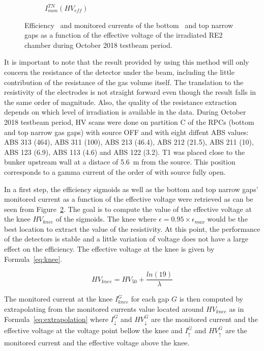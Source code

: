 \begin{figure}[H]
\begin{subfigure}{0.5\linewidth}
        	\caption{\label{fig:october-sig:C} $I_{mon}^{TN}(HV_{eff})$}
    	\end{subfigure}
		\caption{\label{fig:october-sig} Efficiency~ and monitored currents of the bottom~ and top narrow~ gaps as a function of the effective voltage of the irradiated RE2 chamber during October 2018 testbeam period.}
	\end{figure}
	
	It is important to note that the result provided by using this method will only concern the resistance of the detector under the beam, including the little contribution of the resistance of the gas volume itself. The translation to the resistivity of the electrodes is not straight forward even though the result falls in the same order of magnitude. Also, the quality of the resistance extraction depends on which level of irradiation is available in the data. During October 2018 testbeam period, HV scans were done on partition C of the RPCs (bottom and top narrow gas gaps) with source OFF and with eight diffent ABS values: ABS 313 (464), ABS 311 (100), ABS 213 (46.4), ABS 212 (21.5), ABS 211 (10), ABS 123 (6.9), ABS 113 (4.6) and ABS 122 (3.2). T1 was placed close to the bunker upstream wall at a distace of \SI{5.6}{m} from the source. This position corresponds to a gamma current of the order of \siflux with source fully open.
	
	In a first step, the efficiency sigmoids as well as the bottom and top narrow gaps' monitored current as a function of the effective voltage were retrieved as can be seen from Figure~\ref{fig:october-sig}. The goal is to compute the value of the effective voltage at the knee $HV_{knee}$ of the sigmoids. The knee where $\epsilon = 0.95 \times \epsilon_{max}$ would be the best location to extract the value of the resistivity. At this point, the performance of the detectors is stable and a little variation of voltage does not have a large effect on the efficiency. The effective voltage at the knee is given by Formula~\ref{eq:knee}.
	
	\begin{equation}
	\label{eq:knee}
	HV_{knee} = HV_{50} + \frac{ln(19)}{\lambda}
	\end{equation}
	
	The monitored current at the knee $I_{knee}^{G}$ for each gap $G$ is then computed by extrapolating from the monitored currents value located around $HV_{knee}$ as in Formula~\ref{eq:extrapolation} where $I_{\downarrow}^{G}$ and $HV_{\downarrow}^{G}$ are the monitored current and the effective voltage at the voltage point bellow the knee and $I_{\uparrow}^{G}$ and $HV_{\uparrow}^{G}$ are the monitored current and the effective voltage above the knee.
	

